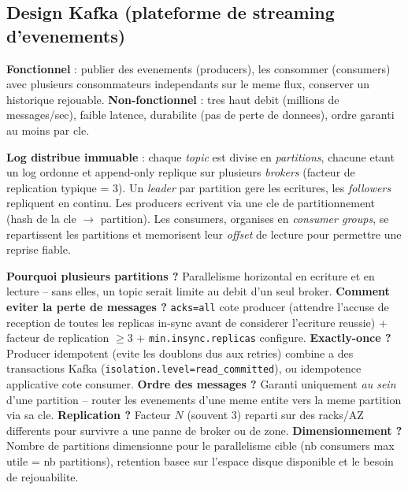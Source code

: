 \documentclass[11pt,a4paper]{article}
\newenvironment{sujet}[1]{%
  \subsection{#1}
}{%
  \bigskip
}
\begin{document}
\begin{sujet}{Design Kafka (plateforme de streaming d'evenements)}

\begin{req}
\textbf{Fonctionnel} : publier des evenements (producers), les consommer (consumers) avec plusieurs consommateurs independants sur le meme flux, conserver un historique rejouable. \textbf{Non-fonctionnel} : tres haut debit (millions de messages/sec), faible latence, durabilite (pas de perte de donnees), ordre garanti au moins par cle.
\end{req}

\begin{archbox}
\textbf{Log distribue immuable} : chaque \emph{topic} est divise en \emph{partitions}, chacune etant un log ordonne et append-only replique sur plusieurs \emph{brokers} (facteur de replication typique = 3). Un \emph{leader} par partition gere les ecritures, les \emph{followers} repliquent en continu. Les producers ecrivent via une cle de partitionnement (hash de la cle $\to$ partition). Les consumers, organises en \emph{consumer groups}, se repartissent les partitions et memorisent leur \emph{offset} de lecture pour permettre une reprise fiable.
\end{archbox}

\begin{tradeoff}
\textbf{Pourquoi plusieurs partitions ?} Parallelisme horizontal en ecriture et en lecture -- sans elles, un topic serait limite au debit d'un seul broker. \textbf{Comment eviter la perte de messages ?} \texttt{acks=all} cote producer (attendre l'accuse de reception de toutes les replicas in-sync avant de considerer l'ecriture reussie) + facteur de replication $\geq 3$ + \texttt{min.insync.replicas} configure. \textbf{Exactly-once ?} Producer idempotent (evite les doublons dus aux retries) combine a des transactions Kafka (\texttt{isolation.level=read\_committed}), ou idempotence applicative cote consumer. \textbf{Ordre des messages ?} Garanti uniquement \emph{au sein} d'une partition -- router les evenements d'une meme entite vers la meme partition via sa cle. \textbf{Replication ?} Facteur $N$ (souvent 3) reparti sur des racks/AZ differents pour survivre a une panne de broker ou de zone. \textbf{Dimensionnement ?} Nombre de partitions dimensionne pour le parallelisme cible (nb consumers max utile = nb partitions), retention basee sur l'espace disque disponible et le besoin de rejouabilite.
\end{tradeoff}

\end{sujet}
\end{document}
